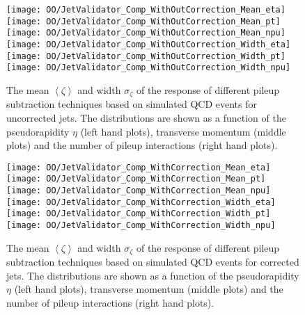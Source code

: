 

\begin{figure}[Ht]
  \centering
  \texttt{[image: OO/JetValidator\_Comp\_WithOutCorrection\_Mean\_eta]}
  \texttt{[image: OO/JetValidator\_Comp\_WithOutCorrection\_Mean\_pt]}
  \texttt{[image: OO/JetValidator\_Comp\_WithOutCorrection\_Mean\_npu]}
  \\
  \texttt{[image: OO/JetValidator\_Comp\_WithOutCorrection\_Width\_eta]}
  \texttt{[image: OO/JetValidator\_Comp\_WithOutCorrection\_Width\_pt]}
  \texttt{[image: OO/JetValidator\_Comp\_WithOutCorrection\_Width\_npu]}
  \caption[Mean and width of the \pt{} response of different pileup subtraction techniques based on simulated QCD events for uncorrected jets]{The mean $\left<\zeta\right>$ and width $\sigma_{\zeta}$ of the \pt{} response of different pileup subtraction techniques based on simulated QCD events for uncorrected jets. The distributions are shown as a function of the pseudorapidity $\eta$ (left hand plots), transverse momentum (middle plots) and the number of pileup interactions (right hand plots). \label{plot:OOJetsPtResponseCompWO}}
\end{figure}
\clearpage{}

\begin{figure}[Ht]
  \centering
  \texttt{[image: OO/JetValidator\_Comp\_WithCorrection\_Mean\_eta]}
  \texttt{[image: OO/JetValidator\_Comp\_WithCorrection\_Mean\_pt]}
  \texttt{[image: OO/JetValidator\_Comp\_WithCorrection\_Mean\_npu]}
  \\
  \texttt{[image: OO/JetValidator\_Comp\_WithCorrection\_Width\_eta]}
  \texttt{[image: OO/JetValidator\_Comp\_WithCorrection\_Width\_pt]}
  \texttt{[image: OO/JetValidator\_Comp\_WithCorrection\_Width\_npu]}
  \caption[Mean and width of the \pt{} response of different pileup subtraction techniques based on simulated QCD events for corrected jets]{The mean $\left<\zeta\right>$ and width $\sigma_{\zeta}$ of the \pt{} response of different pileup subtraction techniques based on simulated QCD events for corrected jets. The distributions are shown as a function of the pseudorapidity $\eta$ (left hand plots), transverse momentum (middle plots) and the number of pileup interactions (right hand plots). \label{plot:OOJetsPtResponseCompW}}
\end{figure}


